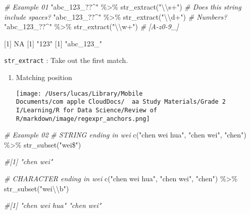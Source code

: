 \documentclass[
]{article}
\let\oldincludegraphics\includegraphics
\renewcommand{\includegraphics}[2][]{\begin{center}\oldincludegraphics[#1]{#2}\end{center}}
\newenvironment{Shaded}{}{}
\newcommand{\CommentTok}[1]{\textcolor[rgb]{0.38,0.63,0.69}{\textit{#1}}}
\newcommand{\ConstantTok}[1]{\textcolor[rgb]{0.53,0.00,0.00}{#1}}
\newcommand{\DecValTok}[1]{\textcolor[rgb]{0.25,0.63,0.44}{#1}}
\newcommand{\FunctionTok}[1]{\textcolor[rgb]{0.02,0.16,0.49}{#1}}
\newcommand{\NormalTok}[1]{#1}
\newcommand{\SpecialCharTok}[1]{\textcolor[rgb]{0.25,0.44,0.63}{#1}}
\newcommand{\StringTok}[1]{\textcolor[rgb]{0.25,0.44,0.63}{#1}}
\begin{document}
\begin{Shaded}
\begin{Highlighting}[]
\CommentTok{\# Example 01}
\StringTok{"abc\_123\_??$$\^{}"} \SpecialCharTok{\%\textgreater{}\%} \FunctionTok{str\_extract}\NormalTok{(}\StringTok{"}\SpecialCharTok{\textbackslash{}\textbackslash{}}\StringTok{s+"}\NormalTok{) }\CommentTok{\# Does this string include spaces? }
\StringTok{"abc\_123\_??$$\^{}"} \SpecialCharTok{\%\textgreater{}\%} \FunctionTok{str\_extract}\NormalTok{(}\StringTok{"}\SpecialCharTok{\textbackslash{}\textbackslash{}}\StringTok{d+"}\NormalTok{) }\CommentTok{\# Numbers? }
\StringTok{"abc\_123\_??$$\^{}"} \SpecialCharTok{\%\textgreater{}\%} \FunctionTok{str\_extract}\NormalTok{(}\StringTok{"}\SpecialCharTok{\textbackslash{}\textbackslash{}}\StringTok{w+"}\NormalTok{) }\CommentTok{\# [A{-}z0{-}9\_]}

\NormalTok{[}\DecValTok{1}\NormalTok{] }\ConstantTok{NA}
\NormalTok{[}\DecValTok{1}\NormalTok{] }\StringTok{"123"}
\NormalTok{[}\DecValTok{1}\NormalTok{] }\StringTok{"abc\_123\_"}
\end{Highlighting}
\end{Shaded}

\texttt{str\_extract} : Take out the first match.

\begin{enumerate}
\def\labelenumi{\arabic{enumi}.}
\item
  Matching position

  \texttt{[image: /Users/lucas/Library/Mobile Documents/com~apple~CloudDocs/~~aa Study Materials/Grade 2 I/Learning/R for Data Science/Review of R/markdown/image/regexpr\_anchors.png]}
\end{enumerate}

\begin{Shaded}
\begin{Highlighting}[]
\CommentTok{\# Example 02}
\CommentTok{\# STRING ending in \textquotesingle{}wei\textquotesingle{}}
\FunctionTok{c}\NormalTok{(}\StringTok{"chen wei hua"}\NormalTok{, }\StringTok{"chen wei"}\NormalTok{, }\StringTok{"chen"}\NormalTok{) }\SpecialCharTok{\%\textgreater{}\%} \FunctionTok{str\_subset}\NormalTok{(}\StringTok{"wei\$"}\NormalTok{)}

\CommentTok{\#[1] "chen wei"}

\CommentTok{\# CHARACTER ending in \textquotesingle{}wei\textquotesingle{} }
\FunctionTok{c}\NormalTok{(}\StringTok{"chen wei hua"}\NormalTok{, }\StringTok{"chen wei"}\NormalTok{, }\StringTok{"chen"}\NormalTok{) }\SpecialCharTok{\%\textgreater{}\%} \FunctionTok{str\_subset}\NormalTok{(}\StringTok{"wei}\SpecialCharTok{\textbackslash{}\textbackslash{}}\StringTok{b"}\NormalTok{)}

\CommentTok{\#[1] "chen wei hua" "chen wei"   }
\end{Highlighting}
\end{Shaded}
\end{document}
